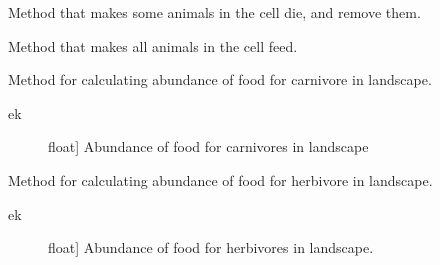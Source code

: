 \documentclass[a4paper,10pt,english]{sphinxmanual}
\begin{document}
\begin{fulllineitems}
\begin{fulllineitems}
\end{fulllineitems}


\begin{fulllineitems}
\label{\detokenize{landscape:biosim.landscape.Jungle.death}}
Method that makes some animals in the cell die, and remove them.

\end{fulllineitems}


\begin{fulllineitems}
\label{\detokenize{landscape:biosim.landscape.Jungle.feeding}}
Method that makes all animals in the cell feed.

\end{fulllineitems}


\begin{fulllineitems}
\label{\detokenize{landscape:biosim.landscape.Jungle.get_abundance_carnivore}}
Method for calculating abundance of food for carnivore in landscape.
\begin{description}
\item[{ek}] \leavevmode{[}float{]}
Abundance of food for carnivores in landscape

\end{description}

\end{fulllineitems}


\begin{fulllineitems}
\label{\detokenize{landscape:biosim.landscape.Jungle.get_abundance_herbivore}}
Method for calculating abundance of food for herbivore in landscape.
\begin{description}
\item[{ek}] \leavevmode{[}float{]}
Abundance of food for herbivores in landscape.

\end{description}


\end{fulllineitems}
\end{fulllineitems}
\end{document}
